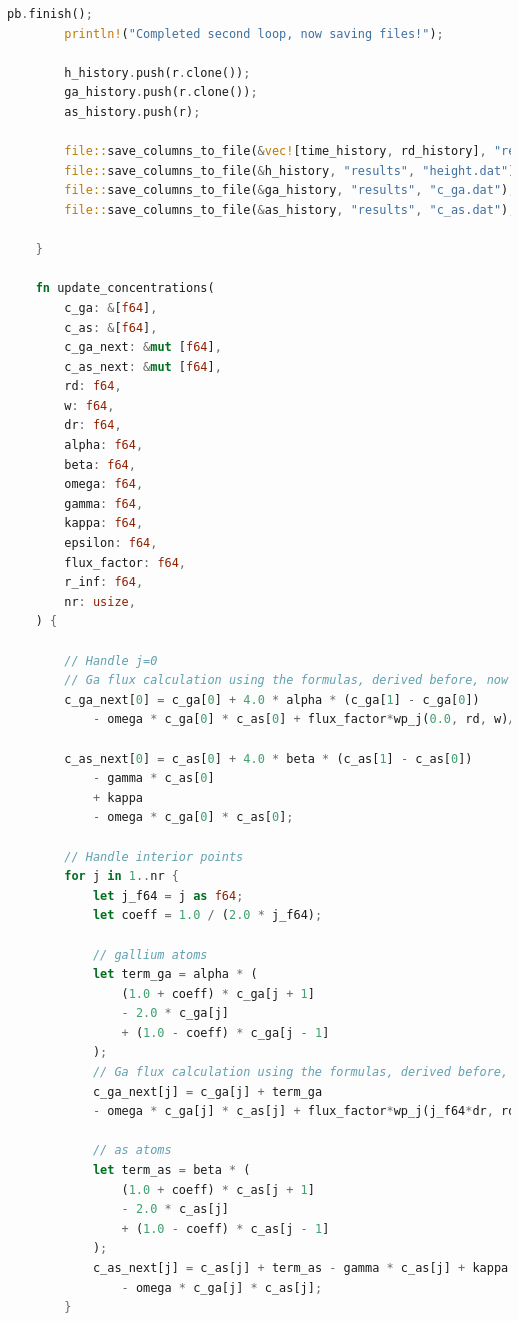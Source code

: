 \documentclass[14pt,oneside]{extarticle}
\begin{document}
\begin{lstlisting}[language=Rust]
        pb.finish();
        println!("Completed second loop, now saving files!");
    
        h_history.push(r.clone());
        ga_history.push(r.clone());
        as_history.push(r);
    
        file::save_columns_to_file(&vec![time_history, rd_history], "results", "droplet.dat");
        file::save_columns_to_file(&h_history, "results", "height.dat");
        file::save_columns_to_file(&ga_history, "results", "c_ga.dat");
        file::save_columns_to_file(&as_history, "results", "c_as.dat");
    
    }
    
    fn update_concentrations(
        c_ga: &[f64],
        c_as: &[f64],
        c_ga_next: &mut [f64],
        c_as_next: &mut [f64],
        rd: f64,
        w: f64,
        dr: f64,
        alpha: f64,
        beta: f64,
        omega: f64,
        gamma: f64,
        kappa: f64,
        epsilon: f64,
        flux_factor: f64,
        r_inf: f64,
        nr: usize,
    ) {
    
        // Handle j=0
        // Ga flux calculation using the formulas, derived before, now gives a correct result
        c_ga_next[0] = c_ga[0] + 4.0 * alpha * (c_ga[1] - c_ga[0])
            - omega * c_ga[0] * c_as[0] + flux_factor*wp_j(0.0, rd, w)/(3.545*rd/w+0.187*w/(r_inf-3.156*w))/(r_inf/rd).ln();
        
        c_as_next[0] = c_as[0] + 4.0 * beta * (c_as[1] - c_as[0]) 
            - gamma * c_as[0] 
            + kappa 
            - omega * c_ga[0] * c_as[0];
    
        // Handle interior points
        for j in 1..nr {
            let j_f64 = j as f64;
            let coeff = 1.0 / (2.0 * j_f64);
            
            // gallium atoms
            let term_ga = alpha * (
                (1.0 + coeff) * c_ga[j + 1] 
                - 2.0 * c_ga[j] 
                + (1.0 - coeff) * c_ga[j - 1]
            );
            // Ga flux calculation using the formulas, derived before, now gives a correct result
            c_ga_next[j] = c_ga[j] + term_ga
            - omega * c_ga[j] * c_as[j] + flux_factor*wp_j(j_f64*dr, rd, w)/(3.545*rd/w+0.187*w/(r_inf-3.156*w))/(r_inf/rd).ln();
            
            // as atoms
            let term_as = beta * (
                (1.0 + coeff) * c_as[j + 1] 
                - 2.0 * c_as[j] 
                + (1.0 - coeff) * c_as[j - 1]
            );
            c_as_next[j] = c_as[j] + term_as - gamma * c_as[j] + kappa 
                - omega * c_ga[j] * c_as[j];
        }
    

\end{lstlisting}
\end{document}
